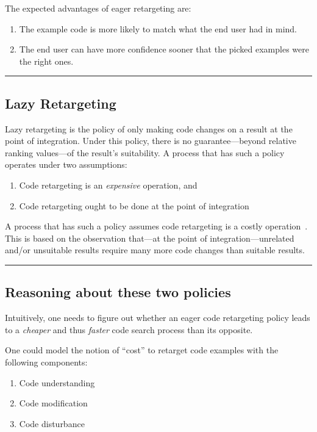 The expected advantages of eager retargeting are:

\begin{enumerate}
	\item The example code is more likely to match what the end user had in mind.
	\item The end user can have more confidence sooner that the picked examples were the right ones.
\end{enumerate}


\fancybreak{\pfbreakdisplay}

\subsection{Lazy Retargeting}

Lazy retargeting is the policy of only making code changes on a result at the point of integration. Under this policy, there is no guarantee---beyond relative ranking values---of the result's suitability. A process that has such a policy operates under two assumptions:

\begin{enumerate}
	\item Code retargeting is an \emph{expensive} operation, and
	\item Code retargeting ought to be done at the point of integration
\end{enumerate}

A process that has such a policy assumes code retargeting is a costly operation~\cite{Brandt:2009ew, Wightman:2012gc}. This is based on the observation that---at the point of integration---unrelated and/or unsuitable results require many more code changes than suitable results.

\fancybreak{\pfbreakdisplay}

\subsection{Reasoning about these two policies}

Intuitively, one needs to figure out whether an eager code retargeting policy leads to a \emph{cheaper} and thus \emph{faster} code search process than its opposite. 

One could model the notion of ``cost'' to retarget code examples with the following components:

\begin{enumerate}
	\item Code understanding
	\item Code modification
	\item Code disturbance
\end{enumerate}
 
